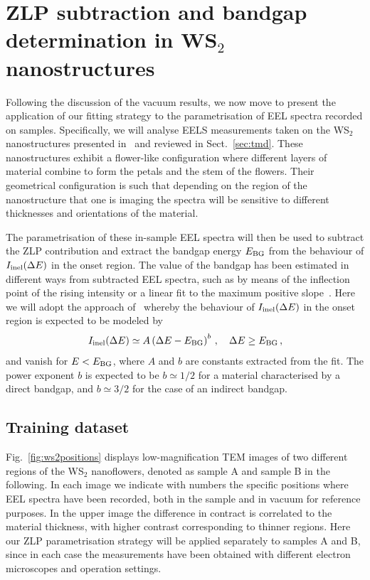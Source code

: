\section{ZLP subtraction and bandgap determination in WS$_2$ nanostructures}
\label{sec:results_sample}

Following the discussion of the vacuum results, we now move
to present the application of our fitting strategy to the parametrisation
of EEL spectra recorded on samples.
%
Specifically, we will analyse EELS measurements taken on the WS$_2$ nanostructures
presented in~\cite{SabryaWS2} and reviewed in Sect.~\ref{sec:tmd}.
%
These nanostructures exhibit a flower-like configuration where different layers
of material combine to form the petals and the stem of the flowers.
%
Their geometrical configuration is such that depending on the region
of the nanostructure that one is imaging the spectra will be sensitive
to different thicknesses and orientations of the material.

The parametrisation of these in-sample EEL spectra will then be used
to subtract the ZLP contribution and extract the bandgap energy $E_{\rm BG}$ from
the behaviour of $I_{\rm inel}(\Delta E)$ in the onset region.
%
The value of the bandgap  has been estimated in different ways
from subtracted EEL spectra, such as by means of the inflection point of the rising intensity or
a linear fit to the maximum positive slope~\cite{Schamm:2003}.
%
Here we will adopt the approach of~\cite{Rafferty:2000} whereby the behaviour
of $I_{\rm inel}(\Delta E)$ in the onset region is expected to be modeled
by
\begin{equation}
  \label{eq:I1}
    I_{\rm inel}(\Delta E) \simeq  A \left( \Delta E-E_{\rm BG} \right)^{b} \, , \quad \Delta E \ge E_{\rm BG} \, ,
\end{equation}
and vanish for $E < E_{\rm BG}$, where $A$ and $b$ are constants extracted from the fit.
%
The power exponent $b$ is expected to be $b\simeq 1/2$ for a material characterised
by a direct bandgap, and $b\simeq 3/2$ for the case of an indirect bandgap.

\subsection{Training dataset}
%
Fig.~\ref{fig:ws2positions} displays
low-magnification TEM images of two different regions of
the WS$_2$ nanoflowers, denoted as sample A and sample B in the following.
%
In each image we indicate with numbers the specific positions where
EEL spectra have been recorded, both in the sample and in vacuum for
reference purposes.
%
In the upper image the difference in contract is correlated to the material
thickness, with higher contrast corresponding to thinner regions.
%
Here our ZLP parametrisation strategy will be applied separately
to samples A and B, since in each case the measurements have
been obtained with different electron microscopes and
operation settings.

